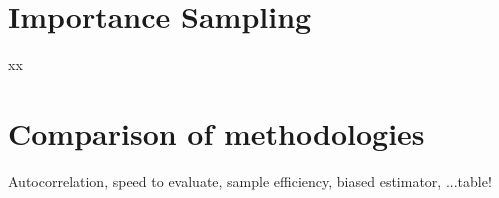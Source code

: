 \documentclass[12pt,letterpaper,twoside]{article}
\begin{document}
\section{Importance Sampling} xx

\section{Comparison of methodologies} Autocorrelation, speed to evaluate, sample efficiency,
 biased estimator, ...table!
 

\end{document}
